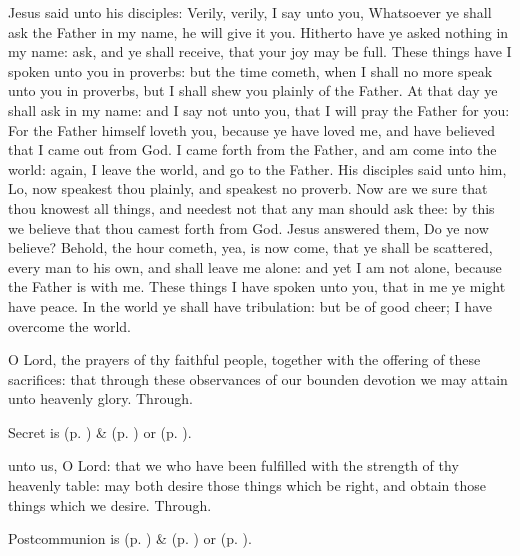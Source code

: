  Jesus said unto his disciples: Verily, verily, I say unto you, Whatsoever ye shall ask the Father in my name, he will give it you. Hitherto have ye asked nothing in my name: ask, and ye shall receive, that your joy may be full. These things have I spoken unto you in proverbs: but the time cometh, when I shall no more speak unto you in proverbs, but I shall shew you plainly of the Father. At that day ye shall ask in my name: and I say not unto you, that I will pray the Father for you: For the Father himself loveth you, because ye have loved me, and have believed that I came out from God. I came forth from the Father, and am come into the world: again, I leave the world, and go to the Father. His disciples said unto him, Lo, now speakest thou plainly, and speakest no proverb. Now are we sure that thou knowest all things, and needest not that any man should ask thee: by this we believe that thou camest forth from God. Jesus answered them, Do ye now believe? Behold, the hour cometh, yea, is now come, that ye shall be scattered, every man to his own, and shall leave me alone: and yet I am not alone, because the Father is with me. These things I have spoken unto you, that in me ye might have peace. In the world ye shall have tribulation: but be of good cheer; I have overcome the world.


\secret
{} O Lord, the prayers of thy faithful people, together with the offering of these sacrifices: that through these observances of our bounden devotion we may attain unto heavenly glory. Through.
\begin{rubric}
     Secret is  (p. \pageref{SPMaryInEaster}) \&   (p. \pageref{SPAgainst}) or  (p. \pageref{SPChiefBishop}).
\end{rubric}


\postcommunion
{} unto us, O Lord: that we who have been fulfilled with the strength of thy heavenly table: may both desire those things which be right, and obtain those things which we desire. Through.
\begin{rubric}
     Postcommunion is  (p. \pageref{SPMaryInEaster}) \&   (p. \pageref{SPAgainst}) or  (p. \pageref{SPChiefBishop}).
\end{rubric}


